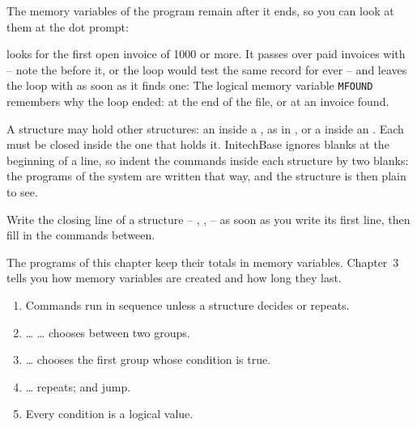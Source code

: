 The memory variables of the program remain after it ends, so you can look at
them at the dot prompt:

 looks for the first open invoice of 1000 or more.  It
passes over paid invoices with  -- note the  before it, or
the loop would test the same record for ever -- and leaves the loop with
 as soon as it finds one:
The logical memory variable \texttt{MFOUND} remembers why the loop ended: at
the end of the file, or at an invoice found.

A structure may hold other structures: an  inside a , as
in , or a  inside an .  Each must be
closed inside the one that holds it.  InitechBase ignores blanks at the
beginning of a line, so indent the commands inside each structure by two
blanks: the programs of the system are written that way, and the structure is
then plain to see.

\begin{Tip}
Write the closing line of a structure -- , ,
 -- as soon as you write its first line, then fill in the commands
between.
\end{Tip}

The programs of this chapter keep their totals in memory variables.  Chapter~3
tells you how memory variables are created and how long they last.

\begin{enumerate}
\item Commands run in sequence unless a structure decides or repeats.
\item {} \ldots{}  \ldots{}  chooses between two groups.
\item {} \ldots{}  chooses the first group whose condition
  is true.
\item {} \ldots{}  repeats;  and  jump.
\item Every condition is a logical value.
\end{enumerate}
